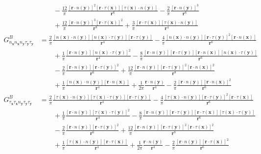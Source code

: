 \documentclass[preprint,12pt,3p]{elsarticle}
\begin{document}
\begin{align}
    &\qquad - \frac{12}{\pi} \frac{[\pmb{r}\cdot n(\mathbf{y})]^2 [\pmb{r} \cdot \tau( \mathbf{x}) ][\tau(\mathbf{x}) \cdot n(\mathbf{y})]}{\pmb{r}^6} - \frac{2}{\pi} \frac{[\pmb{r} \cdot n(\mathbf{y})]^3}{\pmb{r}^6} \nonumber \\
    &\qquad + \frac{12}{\pi} \frac{[\pmb{r} \cdot n(\mathbf{y})]^3 [\pmb{r}\cdot \tau(\mathbf{x})]^2}{\pmb{r}^8}+ \frac{3}{\pi} \frac{[\pmb{r}\cdot \tau(\mathbf{x})][\tau(\mathbf{x}) \cdot n(\mathbf{y})]}{\pmb{r}^4} \\
    G^B_{n_\mathbf{x} n_\mathbf{x} n_\mathbf{y} \tau_\mathbf{y} \tau_\mathbf{y}} &= \frac{2}{\pi} \frac{[n(\mathbf{x}) \cdot n(\mathbf{y}) ] [n(\mathbf{x}) \cdot \tau(\mathbf{y}) ] [\pmb{r} \cdot \tau(\mathbf{y})]}{\pmb{r}^4} - \frac{4}{\pi} \frac{[n(\mathbf{x}) \cdot n(\mathbf{y})][\pmb{r}\cdot \tau(\mathbf{y})]^2 [\pmb{r}\cdot n(\mathbf{x})]}{\pmb{r}^6} \nonumber \\
    &\qquad + \frac{1}{\pi} \frac{[\pmb{r} \cdot n(\mathbf{y}) ] [n(\mathbf{x}) \cdot \tau(\mathbf{y})]^2}{\pmb{r}^4} - \frac{8}{\pi} \frac{[\pmb{r} \cdot n(\mathbf{y})] [\pmb{r} \cdot \tau(\mathbf{y})] [\pmb{r}\cdot n(\mathbf{x})] [n(\mathbf{x}) \cdot \tau(\mathbf{y})]}{\pmb{r}^6} \nonumber \\
    &\qquad -\frac{2 }{\pi} \frac{[\pmb{r} \cdot n(\mathbf{y})] [\pmb{r}\cdot \tau(\mathbf{y})]^2}{\pmb{r}^6} + \frac{12}{\pi} \frac{[\pmb{r} \cdot n(\mathbf{y})][\pmb{r}\cdot \tau(\mathbf{y})]^2 [\pmb{r}\cdot n(\mathbf{x})]^2}{\pmb{r}^8} \nonumber \\
    &\qquad +\frac{1}{\pi} \frac{[n(\mathbf{x}) \cdot n(\mathbf{y})] [\pmb{r}\cdot n(\mathbf{x})]}{\pmb{r}^4} + \frac{1}{2\pi} \frac{\pmb{r} \cdot n(\mathbf{y})}{\pmb{r}^4}  - \frac{2}{\pi} \frac{[\pmb{r}\cdot n(\mathbf{y})][\pmb{r}\cdot n(\mathbf{x})]^2}{\pmb{r}^6} \\
    G^B_{\tau_\mathbf{x} \tau_\mathbf{x} n_\mathbf{y} \tau_\mathbf{y} \tau_\mathbf{y}} &= \frac{2}{\pi} \frac{[\tau(\mathbf{x}) \cdot n(\mathbf{y}) ] [\tau(\mathbf{x}) \cdot \tau(\mathbf{y}) ] [\pmb{r} \cdot \tau(\mathbf{y})]}{\pmb{r}^4} - \frac{4}{\pi} \frac{[\tau(\mathbf{x}) \cdot n(\mathbf{y})][\pmb{r}\cdot \tau(\mathbf{y})]^2 [\pmb{r}\cdot \tau(\mathbf{x})]}{\pmb{r}^6} \nonumber \\
    &\qquad + \frac{1}{\pi} \frac{[\pmb{r} \cdot n(\mathbf{y}) ] [\tau(\mathbf{x}) \cdot \tau(\mathbf{y})]^2}{\pmb{r}^4} - \frac{8}{\pi} \frac{[\pmb{r} \cdot n(\mathbf{y})] [\pmb{r} \cdot \tau(\mathbf{y})] [\pmb{r}\cdot \tau(\mathbf{x})] [\tau(\mathbf{x}) \cdot \tau(\mathbf{y})]}{\pmb{r}^6} \nonumber \\
    &\qquad -\frac{2 }{\pi} \frac{[\pmb{r} \cdot n(\mathbf{y})] [\pmb{r}\cdot \tau(\mathbf{y})]^2}{\pmb{r}^6} + \frac{12}{\pi} \frac{[\pmb{r} \cdot n(\mathbf{y})][\pmb{r}\cdot \tau(\mathbf{y})]^2 [\pmb{r}\cdot \tau(\mathbf{x})]^2}{\pmb{r}^8} \nonumber \\
    &\qquad +\frac{1}{\pi} \frac{[\tau(\mathbf{x}) \cdot n(\mathbf{y})] [\pmb{r}\cdot \tau(\mathbf{x})]}{\pmb{r}^4} + \frac{1}{2\pi} \frac{\pmb{r} \cdot n(\mathbf{y})}{\pmb{r}^4}  - \frac{2}{\pi} \frac{[\pmb{r}\cdot n(\mathbf{y})][\pmb{r}\cdot \tau(\mathbf{x})]^2}{\pmb{r}^6} 
\end{align}
\end{document}
